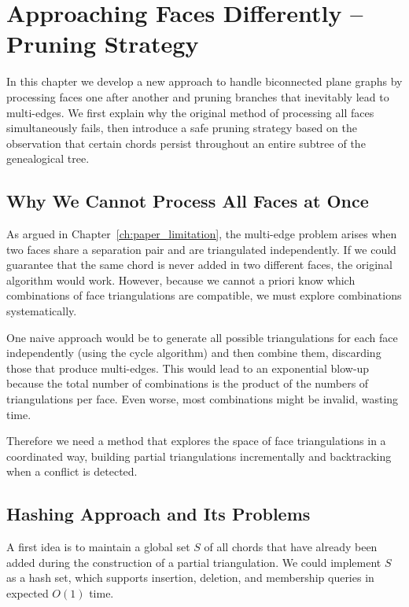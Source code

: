 
\chapter{Approaching Faces Differently – Pruning Strategy}
\label{ch:pruning_strategy}

In this chapter we develop a new approach to handle biconnected plane graphs by processing faces one after another and pruning branches that inevitably lead to multi-edges. 
We first explain why the original method of processing all faces simultaneously fails, then introduce a safe pruning strategy based on the observation that certain chords persist throughout an entire subtree of the genealogical tree.

\section{Why We Cannot Process All Faces at Once}
\label{sec:why_sequential}

As argued in Chapter~\ref{ch:paper_limitation}, the multi-edge problem arises when two faces share a separation pair and are triangulated independently. 
If we could guarantee that the same chord is never added in two different faces, the original algorithm would work. 
However, because we cannot a priori know which combinations of face triangulations are compatible, we must explore combinations systematically.

One naive approach would be to generate all possible triangulations for each face independently (using the cycle algorithm) and then combine them, discarding those that produce multi-edges. 
This would lead to an exponential blow-up because the total number of combinations is the product of the numbers of triangulations per face. 
Even worse, most combinations might be invalid, wasting time.

Therefore we need a method that explores the space of face triangulations in a coordinated way, building partial triangulations incrementally and backtracking when a conflict is detected.

\section{Hashing Approach and Its Problems}
\label{sec:hashing_problems}

A first idea is to maintain a global set \(S\) of all chords that have already been added during the construction of a partial triangulation. 
We could implement \(S\) as a hash set, which supports insertion, deletion, and membership queries in expected \(O(1)\) time.

